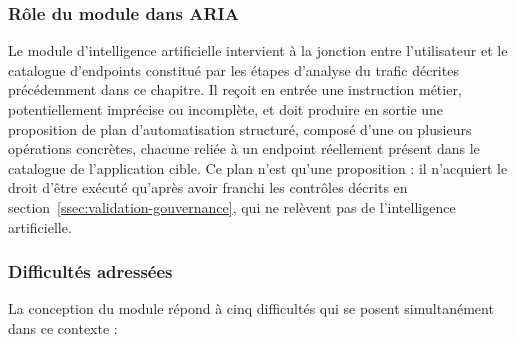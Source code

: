 \subsubsection{Rôle du module dans ARIA}

Le module d'intelligence artificielle intervient à la jonction entre l'utilisateur et le catalogue d'endpoints constitué par les étapes d'analyse du trafic décrites précédemment dans ce chapitre. Il reçoit en entrée une instruction métier, potentiellement imprécise ou incomplète, et doit produire en sortie une proposition de plan d'automatisation structuré, composé d'une ou plusieurs opérations concrètes, chacune reliée à un endpoint réellement présent dans le catalogue de l'application cible. Ce plan n'est qu'une proposition : il n'acquiert le droit d'être exécuté qu'après avoir franchi les contrôles décrits en section~\ref{ssec:validation-gouvernance}, qui ne relèvent pas de l'intelligence artificielle.

\subsubsection{Difficultés adressées}

La conception du module répond à cinq difficultés qui se posent simultanément dans ce contexte :


